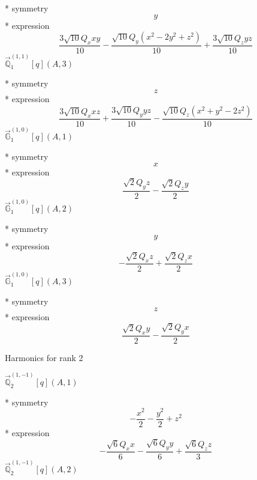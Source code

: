 \documentclass[fleqn,8pt]{jsarticle}
\begin{document}
\noindent\quad ** symmetry
\begin{dmath*}
y
\end{dmath*}
\noindent\quad ** expression
\begin{dmath*}
\frac{3 \sqrt{10} Q_{x} x y}{10} - \frac{\sqrt{10} Q_{y} \left(x^{2} - 2 y^{2} + z^{2}\right)}{10} + \frac{3 \sqrt{10} Q_{z} y z}{10}
\end{dmath*}
\noindent\quad $\vec{\mathbb{Q}}_{1}^{(1,1)}[q](A,3)$

\noindent\quad ** symmetry
\begin{dmath*}
z
\end{dmath*}
\noindent\quad ** expression
\begin{dmath*}
\frac{3 \sqrt{10} Q_{x} x z}{10} + \frac{3 \sqrt{10} Q_{y} y z}{10} - \frac{\sqrt{10} Q_{z} \left(x^{2} + y^{2} - 2 z^{2}\right)}{10}
\end{dmath*}
\noindent\quad $\vec{\mathbb{G}}_{1}^{(1,0)}[q](A,1)$

\noindent\quad ** symmetry
\begin{dmath*}
x
\end{dmath*}
\noindent\quad ** expression
\begin{dmath*}
\frac{\sqrt{2} Q_{y} z}{2} - \frac{\sqrt{2} Q_{z} y}{2}
\end{dmath*}
\noindent\quad $\vec{\mathbb{G}}_{1}^{(1,0)}[q](A,2)$

\noindent\quad ** symmetry
\begin{dmath*}
y
\end{dmath*}
\noindent\quad ** expression
\begin{dmath*}
- \frac{\sqrt{2} Q_{x} z}{2} + \frac{\sqrt{2} Q_{z} x}{2}
\end{dmath*}
\noindent\quad $\vec{\mathbb{G}}_{1}^{(1,0)}[q](A,3)$

\noindent\quad ** symmetry
\begin{dmath*}
z
\end{dmath*}
\noindent\quad ** expression
\begin{dmath*}
\frac{\sqrt{2} Q_{x} y}{2} - \frac{\sqrt{2} Q_{y} x}{2}
\end{dmath*}

\noindent * Harmonics for rank 2

\noindent\quad $\vec{\mathbb{Q}}_{2}^{(1,-1)}[q](A,1)$

\noindent\quad ** symmetry
\begin{dmath*}
- \frac{x^{2}}{2} - \frac{y^{2}}{2} + z^{2}
\end{dmath*}
\noindent\quad ** expression
\begin{dmath*}
- \frac{\sqrt{6} Q_{x} x}{6} - \frac{\sqrt{6} Q_{y} y}{6} + \frac{\sqrt{6} Q_{z} z}{3}
\end{dmath*}
\noindent\quad $\vec{\mathbb{Q}}_{2}^{(1,-1)}[q](A,2)$
\end{document}
